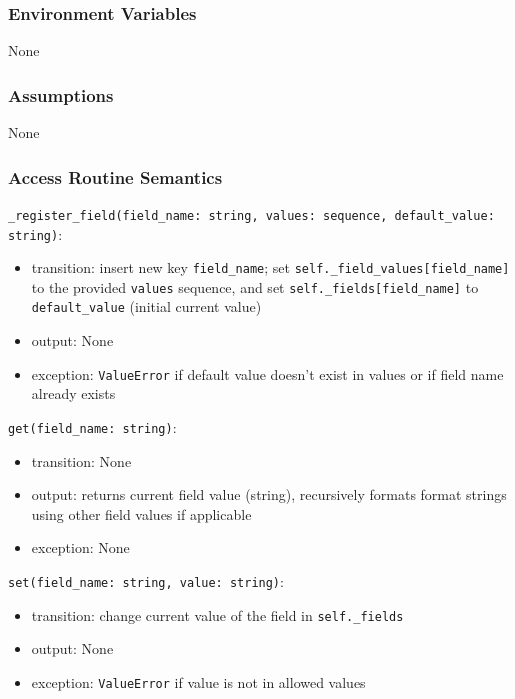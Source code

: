 \documentclass[12pt, titlepage]{article}
\begin{document}
\subsubsection{Environment Variables}


None




\subsubsection{Assumptions}


None




\subsubsection{Access Routine Semantics}


\noindent \lstinline|_register_field(field_name: string, values: sequence, default_value: string)|:
\begin{itemize}
    \item transition: insert new key \lstinline|field_name|; set \lstinline|self._field_values[field_name]| to the provided \lstinline|values| sequence, and set \lstinline|self._fields[field_name]| to \lstinline|default_value| (initial current value)
    \item output: None
    \item exception: \lstinline|ValueError| if default value doesn't exist in values or if field name already exists
\end{itemize}


\noindent \lstinline|get(field_name: string)|:
\begin{itemize}
    \item transition: None
    \item output: returns current field value (string), recursively formats format strings using other field values if applicable
    \item exception: None
\end{itemize}


\noindent \lstinline|set(field_name: string, value: string)|:
\begin{itemize}
    \item transition: change current value of the field in \lstinline|self._fields|
    \item output: None
    \item exception: \lstinline|ValueError| if value is not in allowed values
\end{itemize}
\end{document}
